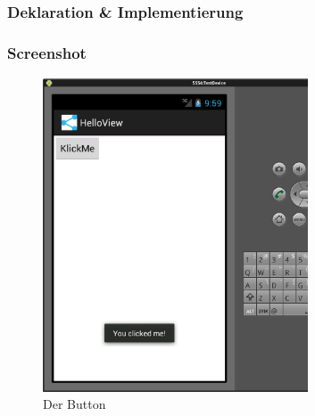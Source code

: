 \begin{frame}
   \frametitle{Deklaration \& Implementierung}
	
	
\end{frame}

\begin{frame}
   \frametitle{Screenshot}
	\begin{figure}[h!]
	  \centering
	  \includegraphics[width=0.7\textwidth]{pictures/button.ps}
	  \caption{
		  Der Button
	  }
	  \label{fig:button}
	\end{figure}
\end{frame}

